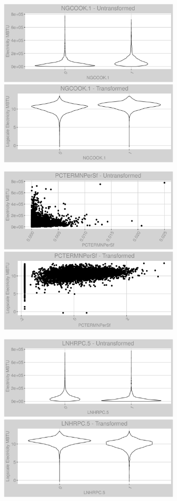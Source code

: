 \FloatBarrier
\newpage
\begin{figure}
\centering
\begin{subfigure}{1\textwidth}
\includegraphics[width=.49\textwidth, height=0.3\textheight]{Images/electricity_psf_var_original_12.png}
\includegraphics[width=.49\textwidth, height=0.3\textheight]{Images/electricity_psf_var_transformed_12.png}
\end{subfigure}
\begin{subfigure}{1\textwidth}
\centering
\includegraphics[width=.49\textwidth, height=0.3\textheight]{Images/electricity_psf_var_original_13.png}
\includegraphics[width=.49\textwidth, height=0.3\textheight]{Images/electricity_psf_var_transformed_13.png}
\end{subfigure}
\begin{subfigure}{1\textwidth}
\centering
\includegraphics[width=.49\textwidth, height=0.3\textheight]{Images/electricity_psf_var_original_14.png}
\includegraphics[width=.49\textwidth, height=0.3\textheight]{Images/electricity_psf_var_transformed_14.png}
\end{subfigure}
\end{figure}
